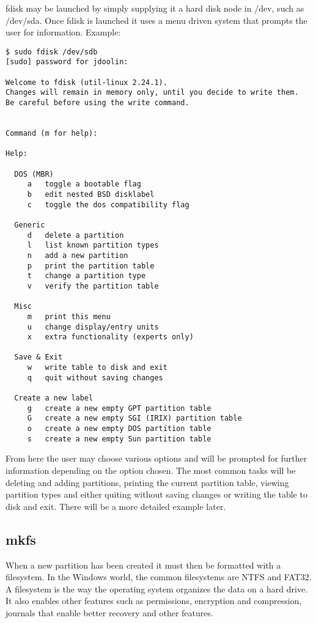 fdisk may be launched by simply supplying it a hard disk node in /dev, such as /dev/sda.  Once fdisk is launched it uses a menu driven system that prompts the user for information. Example:

\begin{verbatim}
$ sudo fdisk /dev/sdb
[sudo] password for jdoolin:

Welcome to fdisk (util-linux 2.24.1).
Changes will remain in memory only, until you decide to write them.
Be careful before using the write command.


Command (m for help):

Help:

  DOS (MBR)
     a   toggle a bootable flag
     b   edit nested BSD disklabel
     c   toggle the dos compatibility flag

  Generic
     d   delete a partition
     l   list known partition types
     n   add a new partition
     p   print the partition table
     t   change a partition type
     v   verify the partition table

  Misc
     m   print this menu
     u   change display/entry units
     x   extra functionality (experts only)

  Save & Exit
     w   write table to disk and exit
     q   quit without saving changes

  Create a new label
     g   create a new empty GPT partition table
     G   create a new empty SGI (IRIX) partition table
     o   create a new empty DOS partition table
     s   create a new empty Sun partition table
\end{verbatim}

From here the user may choose various options and will be prompted for further information depending on the option chosen.  The most common tasks will be deleting and adding partitions, printing the current partition table, viewing partition types and either quiting without saving changes or writing the table to disk and exit.  There will be a more detailed example later.

\subsection{mkfs}

When a new partition has been created it must then be formatted with a filesystem.  In the Windows world, the common filesystems are NTFS and FAT32.  A filesystem is the way the operating system organizes the data on a hard drive.  It also enables other features such as permissions, encryption and compression, journals that enable better recovery and other features.\\

